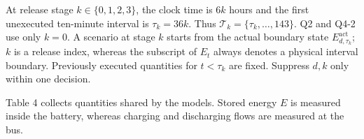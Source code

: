 At release stage \(k\in\{0,1,2,3\}\), the clock time is \(6k\) hours and the first unexecuted ten-minute interval is \(\tau_k=36k\). Thus \(\mathcal T_k=\{\tau_k,\ldots,143\}\). Q2 and Q4-2 use only \(k=0\). A scenario at stage \(k\) starts from the actual boundary state \(E^{\mathrm{act}}_{d,\tau_k}\); \(k\) is a release index, whereas the subscript of \(E_t\) always denotes a physical interval boundary. Previously executed quantities for \(t<\tau_k\) are fixed. Suppress \(d,k\) only within one decision.

Table 4 collects quantities shared by the models. Stored energy \(E\) is measured inside the battery, whereas charging and discharging flows are measured at the bus.

\Needspace{116.8pt}
\begingroup
\fontsize{9.0}{10.8}\selectfont
\setlength{\tabcolsep}{3.2pt}
\renewcommand{\arraystretch}{1.12}
\setlength{\LTleft}{0pt plus 1fill}\setlength{\LTright}{0pt plus 1fill}
\setlength{\LTcapwidth}{\linewidth}

